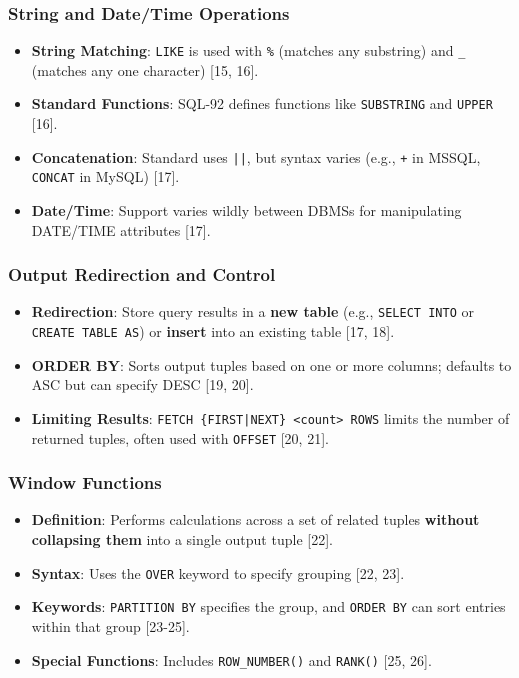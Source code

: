 \documentclass{beamer}
\begin{document}
\begin{frame}
\frametitle{String and Date/Time Operations}
\begin{itemize}
    \item \textbf{String Matching}: \texttt{LIKE} is used with \texttt{\%} (matches any substring) and \texttt{\_} (matches any one character) [15, 16].
    \item \textbf{Standard Functions}: SQL-92 defines functions like \texttt{SUBSTRING} and \texttt{UPPER} [16].
    \item \textbf{Concatenation}: Standard uses \texttt{||}, but syntax varies (e.g., \texttt{+} in MSSQL, \texttt{CONCAT} in MySQL) [17].
    \item \textbf{Date/Time}: Support varies wildly between DBMSs for manipulating DATE/TIME attributes [17].
\end{itemize}
\end{frame}

\begin{frame}
\frametitle{Output Redirection and Control}
\begin{itemize}
    \item \textbf{Redirection}: Store query results in a \textbf{new table} (e.g., \texttt{SELECT INTO} or \texttt{CREATE TABLE AS}) or \textbf{insert} into an existing table [17, 18].
    \item \textbf{ORDER BY}: Sorts output tuples based on one or more columns; defaults to ASC but can specify DESC [19, 20].
    \item \textbf{Limiting Results}: \texttt{FETCH \{FIRST|NEXT\} <count> ROWS} limits the number of returned tuples, often used with \texttt{OFFSET} [20, 21].
\end{itemize}
\end{frame}

\begin{frame}
\frametitle{Window Functions}
\begin{itemize}
    \item \textbf{Definition}: Performs calculations across a set of related tuples \textbf{without collapsing them} into a single output tuple [22].
    \item \textbf{Syntax}: Uses the \texttt{OVER} keyword to specify grouping [22, 23].
    \item \textbf{Keywords}: \texttt{PARTITION BY} specifies the group, and \texttt{ORDER BY} can sort entries within that group [23-25].
    \item \textbf{Special Functions}: Includes \texttt{ROW\_NUMBER()} and \texttt{RANK()} [25, 26].
\end{itemize}
\end{frame}
\end{document}
